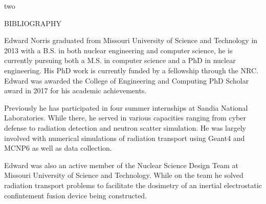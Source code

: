 \documentclass[times,12pt,titlepage]{mstthesis}
\begin{document}
\begin{ThesisBody}



 

\end{ThesisBody}

\begin{ThesisAppendix}{two}



\end{ThesisAppendix}


\begin{ThesisBibliography}{BIBLIOGRAPHY}


\end{ThesisBibliography}


\begin{Vita}
Edward Norris graduated from Missouri University of Science and Technology in 2013 with a B.S. in both nuclear engineering and computer science, he is currently pursuing both a M.S. in computer science and a PhD in nuclear engineering. His PhD work is currently funded by a fellowship through the NRC. Edward was awarded the College of Engineering and Computing PhD Scholar award in 2017 for his academic achievements.

Previously he has participated in four summer internships at Sandia National Laboratories. While there, he served in various capacities ranging from cyber defense to radiation detection and neutron scatter simulation. He was largely involved with numerical simulations of radiation transport using Geant4 and MCNP6 as well as data collection.

Edward was also an active member of the Nuclear Science Design Team at Missouri University of Science and Technology. While on the team he solved radiation transport problems to facilitate the dosimetry of an inertial electrostatic confintement fusion device being constructed.


\end{Vita}
\end{document}
